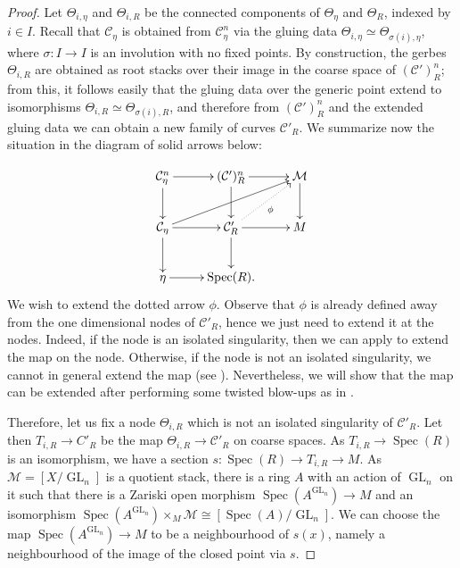 \documentclass{amsart}
\newcommand{\cC}{\mathcal{C}}
\newcommand{\cM}{\mathcal{M}}
\newcommand{\spec}{\operatorname{Spec}}
\newcommand{\GL}{\operatorname{GL}}
\theoremstyle{definition}
\begin{document}
\begin{proof}
Let $\Theta_{i,\eta}$ and $\Theta_{i,R}$ be the connected components of $\Theta_\eta$ and $\Theta_R$, indexed by $i\in I$. Recall that $\cC_\eta$ is obtained from $\cC_\eta^n$ via the gluing data $\Theta_{i,\eta}\simeq \Theta_{\sigma(i),\eta}$, where $\sigma:I\to I$ is an involution with no fixed points. By construction, the gerbes $\Theta_{i,R}$ are obtained as root stacks over their image in the coarse space of $(\cC')^n_R$; from this, it follows easily that the gluing data over the generic point extend to isomorphisms $\Theta_{i,R}\simeq \Theta_{\sigma(i),R}$, and therefore from $(\cC')^n_R$ and the extended gluing data we can obtain a new family of curves $\cC'_R$. We summarize now the situation in the diagram of solid arrows below:

$$\xymatrix{\cC_\eta^n \ar[d]\ar[r] & (\cC')^n_R\ar[r] \ar[d] & \cM\ar[d] \\
\cC_\eta \ar[r] \ar[d] \ar[rru] & \cC'_R\ar[r] \ar@{..>}[ru]_\phi \ar[d] & M\\\eta \ar[r] & \spec(R). & }$$
We wish to extend the dotted arrow $\phi$. Observe that $\phi$ is already defined away from the one dimensional nodes of $\cC'_R$, hence we just need to extend it at the nodes. Indeed, if the node is an isolated singularity, then we can apply  to extend the map on the node. Otherwise, if the node is not an isolated singularity, we cannot in general extend the map (see ). 
Nevertheless, we will show that the map can be extended after performing some twisted blow-ups as in .


Therefore, let us fix a node $\Theta_{i,R}$ which is not an isolated singularity of $\cC'_R$. Let then $T_{i,R}\to C'_R$ be the map $\Theta_{i,R}\to \cC'_R$ on coarse spaces. As $T_{i,R}\to \spec(R)$ is an isomorphism, we have a section $s:\spec(R)\to T_{i,R}\to M$. As $\cM=[X/\GL_n]$ is a quotient stack, there is a ring $A$ with an action of $\GL_n$ on it such that there is a Zariski open morphism $\spec(A^{\GL_n})\to M$ and an isomorphism $\spec(A^{\GL_n})\times_M\cM\cong [\spec(A)/\GL_n]$. We can choose the map $\spec(A^{\GL_n})\to M$ to be a neighbourhood of $s(x)$, namely a neighbourhood of the image of the closed point via $s$.


\end{proof}
\end{document}
